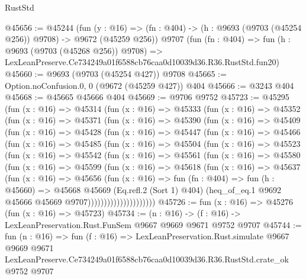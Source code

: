 \begin{lexlean}{RustStd}
\begin{coremodule}
@45656 := @45244
    (fun (y : @16) => (fn : @404) -> (h : @9693 (@9703 (@45254 @256)) @9708) -> @9672 (@45259 @256))
    @9707
    (fun (fn : @404) =>
    fun (h : @9693 (@9703 (@45268 @256)) @9708) =>
    LexLeanPreserve.Ce734249a01f6588cb76caa0d10039d36.R36.RustStd.fun20)
@45660 := @9693 (@9703 (@45254 @427)) @9708
@45665 := Option.noConfusion.{0, 0} (@9672 (@45259 @427)) @404
@45666 := @3243 @404
@45668 := @45665 @45666 @404
@45669 := @9706 @9752
@45723 := @45295
    (fun (x : @16) =>
    @45314
      (fun (x : @16) =>
      @45333
        (fun (x : @16) =>
        @45352
          (fun (x : @16) =>
          @45371
            (fun (x : @16) =>
            @45390
              (fun (x : @16) =>
              @45409
                (fun (x : @16) =>
                @45428
                  (fun (x : @16) =>
                  @45447
                    (fun (x : @16) =>
                    @45466
                      (fun (x : @16) =>
                      @45485
                        (fun (x : @16) =>
                        @45504
                          (fun (x : @16) =>
                          @45523
                            (fun (x : @16) =>
                            @45542
                              (fun (x : @16) =>
                              @45561
                                (fun (x : @16) =>
                                @45580
                                  (fun (x : @16) =>
                                  @45599
                                    (fun (x : @16) =>
                                    @45618
                                      (fun (x : @16) =>
                                      @45637
                                        (fun (x : @16) =>
                                        @45656
                                          (fun (x : @16) =>
                                          fun (fn : @404) =>
                                          fun (h : @45660) =>
                                          @45668
                                            @45669
                                            (Eq.refl.{2} (Sort 1) @404)
                                            (heq_of_eq.{1}
                                              @9692
                                              @45666
                                              @45669
                                              @9707)))))))))))))))))))))
@45726 := fun (x : @16) => @45276 (fun (x : @16) => @45723)
@45734 := (n : @16) -> (f : @16) -> LexLeanPreservation.Rust.FunSem @9667 @9669 @9671 @9752 @9707
@45744 := fun (n : @16) =>
  fun (f : @16) =>
  LexLeanPreservation.Rust.simulate
    @9667
    @9669
    @9671
    LexLeanPreserve.Ce734249a01f6588cb76caa0d10039d36.R36.RustStd.crate_ok
    @9752
    @9707
\end{coremodule}
\end{lexlean}
